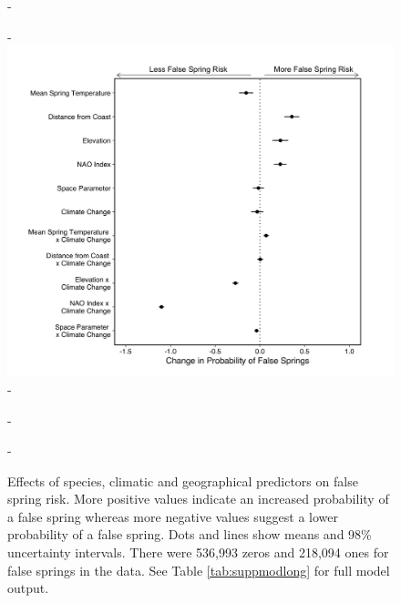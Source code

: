 \documentclass{article}\usepackage[]{graphicx}\usepackage[]{color}
\begin{document}
  
{\begin{figure} [H]
  -\begin{center}
  -\includegraphics[width=12cm]{..//..//analyses/figures/model_output_98_long.png}
  -\caption{Effects of species, climatic and geographical predictors on false spring risk. More positive values indicate an increased probability of a false spring whereas more negative values suggest a lower probability of a false spring. Dots and lines show means and 98\% uncertainty intervals. There were 536,993 zeros and 218,094 ones for false springs in the data. See Table \ref{tab:suppmodlong} for full model output.}\label{fig:maineffects}
  -\end{center}
  -\end{figure}}
\end{document}
